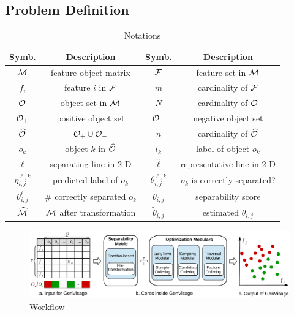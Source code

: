 \subsection{Problem Definition}\label{sec:prob}

\begin{table}[t!]
\centering
\small
\begin{tabular}{c|c|c|c}
   Symb. & Description & Symb. & Description\\
    \hline
    \hline
    $\mm$ & feature-object matrix & $\ff$ & feature set in $\mm$ \\
    \hline
    $f_i$ & feature $i$ in $\ff$ & $m$ & cardinality of $\ff$\\
    \hline
    $\oo$ & object set in $\mm$ & $N$ & cardinality of $\oo$\\
    \hline
    $\oo_+$ & positive object set & $\oo_-$ & negative object set\\
    \hline
    $\widehat{\oo}$ & $\oo_+\cup \oo_-$ & $n$ & cardinality of $\widehat{\oo}$\\
    \hline
    $o_k$ & object $k$ in $\widehat{\oo}$ & $l_k$ & label of object $o_k$\\
    \hline
    $\ell$ & separating line in 2-D & $\hat{\ell}$ & representative line  in 2-D\\
    \hline
    $\eta_{i,j}^{\ell,k}$ & predicted label of $o_k$ & $\theta_{i,j}^{\ell,k}$ & $o_k$ is correctly separated? \\
    \hline
    $\theta_{i,j}^{\ell}$ & \# correctly separated $o_k$ & $\theta_{i,j}$ & separability score\\
    \hline
    $\widehat{\mm}$ & $\mm$ after transformation &  $\tilde{\theta}_{i,j}$ & estimated $\theta_{i,j}$\\
    \hline
 \end{tabular}
\caption{Notations}
\label{tbl:notation}
\vspace{-18pt}
\end{table}

\begin{figure}[t]
  \centering
  \includegraphics[width=0.9\linewidth]{fig/workflow2.pdf}
\caption{\genviz Workflow}
\label{fig:workflow}
\end{figure} 


